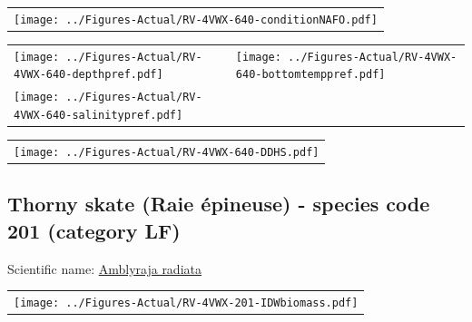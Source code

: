 \documentclass[12pt]{article}\usepackage[]{graphicx}\usepackage[]{color}
\begin{document}
\vspace{1cm}
\begin{minipage}{1.0\textwidth}
 \begin{tabular}{c}
\texttt{[image: ../Figures-Actual/RV-4VWX-640-conditionNAFO.pdf]} \\ 
\end{tabular} 
\end{minipage}
\clearpage
\begin{minipage}{1.0\textwidth}
 \begin{tabular}[t]{m{3in}m{3in}}
\texttt{[image: ../Figures-Actual/RV-4VWX-640-depthpref.pdf]} & 
\texttt{[image: ../Figures-Actual/RV-4VWX-640-bottomtemppref.pdf]} \\ 
\texttt{[image: ../Figures-Actual/RV-4VWX-640-salinitypref.pdf]} & 
 \\ 
\end{tabular} 
\end{minipage}
\newline

\vspace{1cm}
\begin{minipage}{1.0\textwidth}
 \begin{tabular}{c}
\texttt{[image: ../Figures-Actual/RV-4VWX-640-DDHS.pdf]} \\ 
\end{tabular} 
\end{minipage}
\clearpage

\renewcommand\thefigure{\thesubsection\Alph{figure}}

\setcounter{figure}{0}

\hypertarget{sec:201}{%
\subsection{Thorny skate (Raie épineuse) - species code 201 (category LF)}\label{sec:201}}

  


Scientific name: \href{http://www.marinespecies.org/aphia.php?p=taxdetails\&id=105865}{Amblyraja radiata} \newline
\begin{minipage}{1.0\textwidth}
 \begin{tabular}{c}
\texttt{[image: ../Figures-Actual/RV-4VWX-201-IDWbiomass.pdf]} \\ 
\end{tabular} 
\end{minipage}
\newline
\end{document}
